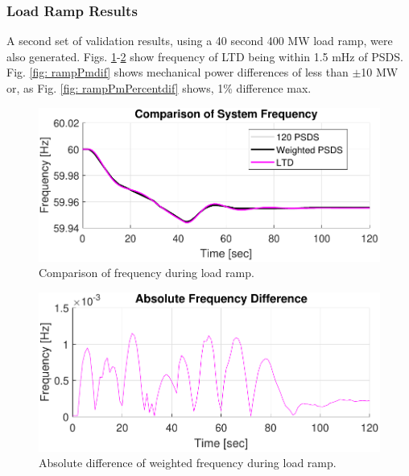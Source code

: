 \subsubsection{Load Ramp Results}
A second set of validation results, using a 40 second 400 MW load ramp, were also generated. Figs. \ref{fig: rampFcomp}-\ref{fig: rampFdif} show frequency of LTD being within 1.5 mHz of PSDS.
Fig. \ref{fig: rampPmdif} shows mechanical power differences of less than $\pm$10 MW or, as Fig. \ref{fig: rampPmPercentdif} shows, 1\% difference max.

\begin{figure}[!ht]
	\centering
	\includegraphics[width=\linewidth]{figures/miniWECC3ALTDrampF3}
	\caption{Comparison of frequency during load ramp.}
	\label{fig: rampFcomp}
\end{figure}

\begin{figure}[!ht]
	\centering
	\includegraphics[width=\linewidth]{figures/miniWECC3ALTDrampRelF}
	\caption{Absolute difference of weighted frequency during load ramp.}
	\label{fig: rampFdif}
\end{figure}

